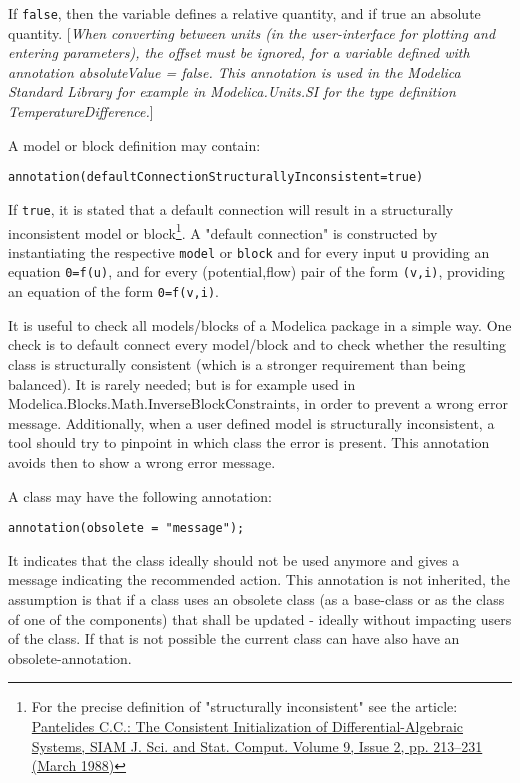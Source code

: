 If \lstinline!false!, then the variable defines a relative quantity, and if true an
absolute quantity. {[}\emph{When converting between units (in the
user-interface for plotting and entering parameters), the offset must be
ignored, for a variable defined with annotation absoluteValue = false.
This annotation is used in the Modelica Standard Library for example in
Modelica.Units.SI for the type definition TemperatureDifference.}{]}

A model or block definition may contain:
\begin{lstlisting}[language=modelica]
  annotation(defaultConnectionStructurallyInconsistent=true)
\end{lstlisting}

If \lstinline!true!, it is stated that a default connection will result in a
structurally inconsistent model or block\footnote{For the precise
  definition of "structurally inconsistent" see the article:
  \href{http://epubs.siam.org/doi/abs/10.1137/0909014}{Pantelides C.C.:
  The Consistent Initialization of Differential-Algebraic Systems, SIAM
  J. Sci. and Stat. Comput. Volume 9, Issue 2, pp. 213--231 (March
  1988)}}. A "default connection" is constructed by instantiating the
respective \lstinline!model! or \lstinline!block! and for every input \lstinline!u! providing an equation
\lstinline!0=f(u)!, and for every (potential,flow) pair of the form \lstinline!(v,i)!, providing
an equation of the form \lstinline!0=f(v,i)!.

\begin{nonnormative}
It is useful to check all models/blocks of a Modelica package
in a simple way. One check is to default connect every model/block and
to check whether the resulting class is structurally consistent (which is a
stronger requirement than being balanced). It is rarely needed; but is for
example used in Modelica.Blocks.Math.InverseBlockConstraints, in order
to prevent a wrong error message. Additionally, when a user defined
model is structurally inconsistent, a tool should try to pinpoint in
which class the error is present. This annotation avoids then to show a
wrong error message.
\end{nonnormative}

A class may have the following annotation:
\begin{lstlisting}[language=modelica]
  annotation(obsolete = "message");
\end{lstlisting}

It indicates that the class ideally should not be used anymore and gives
a message indicating the recommended action.
This annotation is not inherited, the assumption is that if a class uses
an obsolete class (as a base-class or as the class of one of the components)
that shall be updated - ideally without impacting users of the class.
If that is not possible the current class can have also have an obsolete-annotation.

